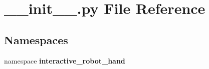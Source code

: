 \section{\-\_\-\-\_\-init\-\_\-\-\_\-.\-py File Reference}
\label{____init_____8py}
\subsection*{Namespaces}
\begin{DoxyCompactItemize}
\item 
namespace {\bf interactive\-\_\-robot\-\_\-hand}
\end{DoxyCompactItemize}
